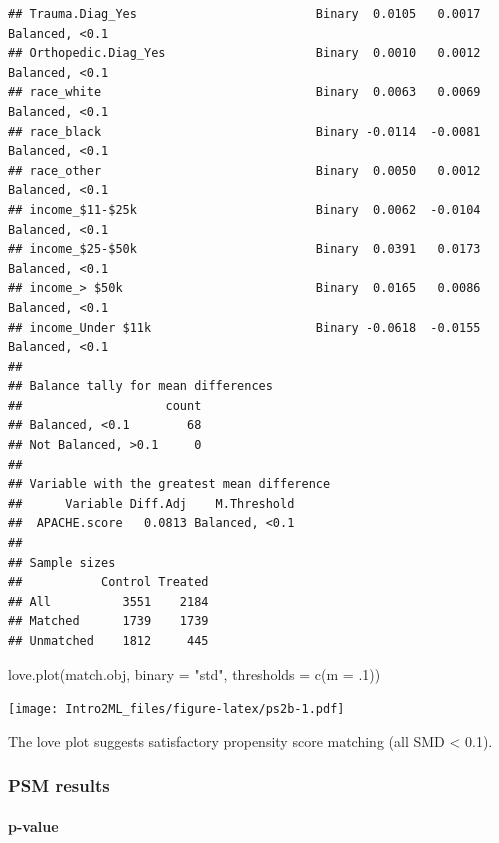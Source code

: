 \documentclass[
]{book}
\newenvironment{Shaded}{\begin{snugshade}}{\end{snugshade}}
\newcommand{\AttributeTok}[1]{\textcolor[rgb]{0.77,0.63,0.00}{#1}}
\newcommand{\DecValTok}[1]{\textcolor[rgb]{0.00,0.00,0.81}{#1}}
\newcommand{\FunctionTok}[1]{\textcolor[rgb]{0.00,0.00,0.00}{#1}}
\newcommand{\NormalTok}[1]{#1}
\newcommand{\StringTok}[1]{\textcolor[rgb]{0.31,0.60,0.02}{#1}}
\begin{document}
\begin{verbatim}
## Trauma.Diag_Yes                         Binary  0.0105   0.0017 Balanced, <0.1
## Orthopedic.Diag_Yes                     Binary  0.0010   0.0012 Balanced, <0.1
## race_white                              Binary  0.0063   0.0069 Balanced, <0.1
## race_black                              Binary -0.0114  -0.0081 Balanced, <0.1
## race_other                              Binary  0.0050   0.0012 Balanced, <0.1
## income_$11-$25k                         Binary  0.0062  -0.0104 Balanced, <0.1
## income_$25-$50k                         Binary  0.0391   0.0173 Balanced, <0.1
## income_> $50k                           Binary  0.0165   0.0086 Balanced, <0.1
## income_Under $11k                       Binary -0.0618  -0.0155 Balanced, <0.1
## 
## Balance tally for mean differences
##                    count
## Balanced, <0.1        68
## Not Balanced, >0.1     0
## 
## Variable with the greatest mean difference
##      Variable Diff.Adj    M.Threshold
##  APACHE.score   0.0813 Balanced, <0.1
## 
## Sample sizes
##           Control Treated
## All          3551    2184
## Matched      1739    1739
## Unmatched    1812     445
\end{verbatim}

\begin{Shaded}
\begin{Highlighting}[]
\FunctionTok{love.plot}\NormalTok{(match.obj, }\AttributeTok{binary =} \StringTok{"std"}\NormalTok{, }
          \AttributeTok{thresholds =} \FunctionTok{c}\NormalTok{(}\AttributeTok{m =}\NormalTok{ .}\DecValTok{1}\NormalTok{))  }
\end{Highlighting}
\end{Shaded}

\texttt{[image: Intro2ML\_files/figure-latex/ps2b-1.pdf]}

The love plot suggests satisfactory propensity score matching (all SMD \textless{} 0.1).

\hypertarget{psm-results}{%
\subsubsection{PSM results}\label{psm-results}}

\hypertarget{p-value}{%
\paragraph{p-value}\label{p-value}}
\end{document}
